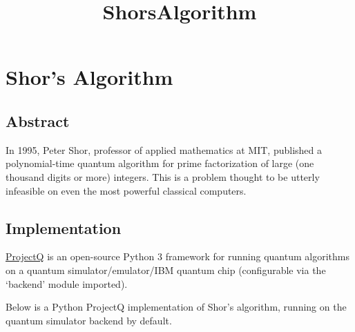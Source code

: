 \documentclass[11pt]{article}
\title{ShorsAlgorithm}
\begin{document}
    
    
    \maketitle
    
    

    
    \hypertarget{shors-algorithm}{%
\section{Shor's Algorithm}\label{shors-algorithm}}

\hypertarget{abstract}{%
\subsection{Abstract}\label{abstract}}

In 1995, Peter Shor, professor of applied mathematics at MIT, published
a polynomial-time quantum algorithm for prime factorization of large
(one thousand digits or more) integers. This is a problem thought to be
utterly infeasible on even the most powerful classical computers.

\hypertarget{implementation}{%
\subsection{Implementation}\label{implementation}}

\href{https://projectq.ch/}{ProjectQ} is an open-source Python 3
framework for running quantum algorithms on a quantum
simulator/emulator/IBM quantum chip (configurable via the `backend'
module imported).

Below is a Python ProjectQ implementation of Shor's algorithm, running
on the quantum simulator backend by default.
\end{document}
